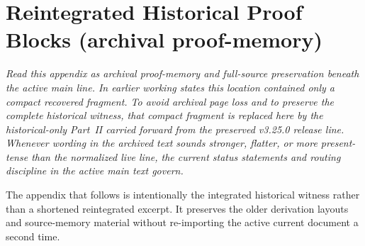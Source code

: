 \section{Reintegrated Historical Proof Blocks (archival proof-memory)}
\label{app:formal-reintegrated}

\textit{Read this appendix as archival proof-memory and full-source preservation beneath the active main line. In earlier working states this location contained only a compact recovered fragment. To avoid archival page loss and to preserve the complete historical witness, that compact fragment is replaced here by the historical-only Part~II carried forward from the preserved v3.25.0 release line. Whenever wording in the archived text sounds stronger, flatter, or more present-tense than the normalized live line, the current status statements and routing discipline in the active main text govern.}

\begin{remark}
The appendix that follows is intentionally the integrated historical witness rather than a shortened reintegrated excerpt. It preserves the older derivation layouts and source-memory material without re-importing the active current document a second time.
\end{remark}


\clearpage
